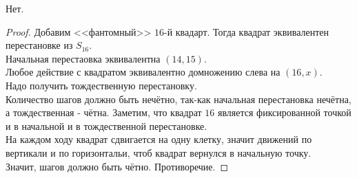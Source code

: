\documentclass[11pt, oneside]{article}   	%
\begin{document}
    \begin{dlemma}
        Нет.\\
        \begin{proof}
            Добавим <<фантомный>> $16$-й квадарт. Тогда квадрат эквивалентен перестановке из $S_{16}$.\\
            Начальная перестаовка эквивалентна $\left( 14, 15 \right) $.\\
            Любое действие с квадратом эквивалентно домножению слева на $\left( 16, x \right) $.\\
            Надо получить тождественную перестановку.\\
            Количество шагов должно быть нечётно, так-как начальная перестановка нечётна, а тождественная - чётна.
            Заметим, что квадрат $16$ является фиксированной точкой и в начальной и в тождественной перестановке.\\
            На каждом ходу квадрат сдвигается на одну клетку, значит движений по вертикали и по горизонтальи, чтоб квадрат вернулся в начальную точку.\\
            Значит, шагов должно быть чётно. Противоречие.
        \end{proof}
    \end{dlemma}
\end{document}
